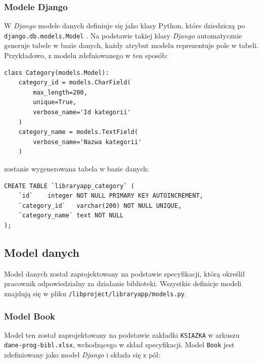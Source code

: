 \documentclass[twoside]{projektInzynierskiMS}
\begin{document}
\subsubsection{Modele Django}
W \textit{Django} modele danych definiuje się jako klasy Python, które dziedziczą po \verb`django.db.models.Model` \cite{DjangoModel}. Na podstawie takiej klasy \textit{Django} automatycznie generuje tabele w bazie danych, każdy atrybut modelu reprezentuje pole w tabeli. Przykładowo, z modelu zdefniowanego w ten sposób:

\begin{verbatim}
class Category(models.Model):
    category_id = models.CharField(
        max_length=200,
        unique=True,
        verbose_name='Id kategorii'
    )
    category_name = models.TextField(
        verbose_name='Nazwa kategorii'
    )
\end{verbatim}
zostanie wygenerowana tabela w bazie danych:
\begin{verbatim}
CREATE TABLE `libraryapp_category` (
	`id`	integer NOT NULL PRIMARY KEY AUTOINCREMENT,
	`category_id`	varchar(200) NOT NULL UNIQUE,
	`category_name`	text NOT NULL
);
\end{verbatim}

\subsection{Model danych}

Model danych został zaprojektowany na podstawie specyfikacji, którą określił pracownik odpowiedzialny za działanie biblioteki. Wszystkie definicje modeli znajdują się w pliku \verb`/libproject/libraryapp/models.py`.

\subsubsection{Model Book}

Model ten został zaprojektowany na podstawie zakładki \verb`KSIAZKA` w arkuszu \verb`dane-prog-bibl.xlsx`, wchodzącego w skład specyfikacji. Model \verb`Book` jest zdefiniowany jako model \textit{Django} i składa się z pól:
\end{document}
